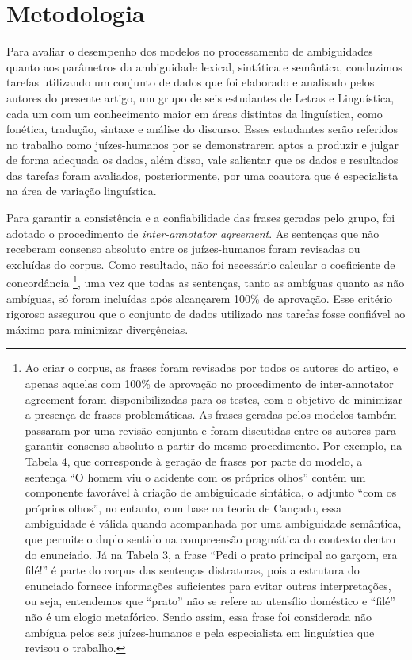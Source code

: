 \section{Metodologia}\label{sec-metodologia}

Para avaliar o desempenho dos modelos no processamento de ambiguidades quanto aos parâmetros da ambiguidade lexical, sintática e semântica, conduzimos tarefas utilizando um conjunto de dados que foi elaborado e analisado pelos autores do presente artigo, um grupo de seis estudantes de Letras e Linguística, cada um com um conhecimento maior em áreas distintas da linguística, como fonética, tradução, sintaxe e análise do discurso. Esses estudantes serão referidos no trabalho como juízes-humanos por se demonstrarem aptos a produzir e julgar de forma adequada os dados, além disso, vale salientar que os dados e resultados das tarefas foram avaliados, posteriormente, por uma coautora que é especialista na área de variação linguística.

Para garantir a consistência e a confiabilidade das frases geradas pelo grupo, foi adotado o procedimento de \textit{inter-annotator agreement}. As sentenças que não receberam consenso absoluto entre os juízes-humanos foram revisadas ou excluídas do corpus. Como resultado, não foi necessário calcular o coeficiente de concordância {\footnote{Ao criar o corpus, as frases foram revisadas por todos os autores do artigo, e apenas aquelas com 100\% de aprovação no procedimento de inter-annotator agreement foram disponibilizadas para os testes, com o objetivo de minimizar a presença de frases problemáticas. As frases geradas pelos modelos também passaram por uma revisão conjunta e foram discutidas entre os autores para garantir consenso absoluto a partir do mesmo procedimento. Por exemplo, na Tabela 4, que corresponde à geração de frases por parte do modelo, a sentença \enquote{O homem viu o acidente com os próprios olhos} contém um componente favorável à criação de ambiguidade sintática, o adjunto \enquote{com os próprios olhos}, no entanto, com base na teoria de Cançado, essa ambiguidade é válida quando acompanhada por uma ambiguidade semântica, que permite o duplo sentido na compreensão pragmática do contexto dentro do enunciado. Já na Tabela 3, a frase \enquote{Pedi o prato principal ao garçom, era filé!} é parte do corpus das sentenças distratoras, pois a estrutura do enunciado fornece informações suficientes para evitar outras interpretações, ou seja, entendemos que \enquote{prato} não se refere ao utensílio doméstico e \enquote{filé} não é um elogio metafórico. Sendo assim, essa frase foi considerada não ambígua pelos seis juízes-humanos e pela especialista em linguística que revisou o trabalho.}}, uma vez que todas as sentenças, tanto as ambíguas quanto as não ambíguas, só foram incluídas após alcançarem 100\% de aprovação. Esse critério rigoroso assegurou que o conjunto de dados utilizado nas tarefas fosse  confiável ao máximo para minimizar divergências.

